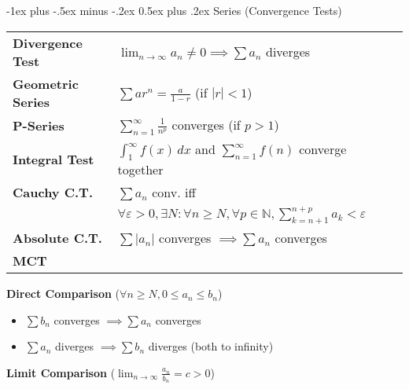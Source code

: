 \documentclass[a4paper,12pt]{article}
\makeatletter
\renewcommand{\section}{\@startsection{section}{1}{0mm}%
                                {-1ex plus -.5ex minus -.2ex}%
                                {0.5ex plus .2ex}%
                                {\normalfont\large\bfseries}}
\makeatother
\begin{document}
\begin{multicols}{2}

\setlength{\premulticols}{1pt}
\setlength{\postmulticols}{1pt}
\setlength{\multicolsep}{1pt}
\setlength{\columnsep}{1pt}

\section{Series (Convergence Tests)}

\renewcommand{\arraystretch}{2} %


\begin{tabular}{@{}ll@{}l@{}}
\textbf{Divergence Test} & $\displaystyle\lim_{n\to\infty} a_n \neq 0 \implies \sum a_n$ diverges \\
\textbf{Geometric Series} & $\displaystyle\sum ar^n = \frac{a}{1-r}$ (if $|r|<1$) \\
\textbf{P-Series} & $\displaystyle\sum_{n=1}^{\infty} \frac{1}{n^p}$ converges (if $p>1$) \\
\textbf{Integral Test} & $\displaystyle\int_{1}^{\infty} f(x) \, dx$ and $\displaystyle\sum_{n=1}^{\infty} f(n)$ converge together \\
\textbf{Cauchy C.T.} & $\displaystyle\sum a_n$ conv. iff \\
& $\forall \varepsilon > 0, \exists N: \forall n \geq N, \forall p \in \mathbb{N}, \sum_{k=n+1}^{n+p} a_k < \varepsilon$ \\
\textbf{Absolute C.T.} & $\sum |a_n|$ converges $\implies \sum a_n$ converges \\
\textbf{MCT} \\

\end{tabular}


\textbf{Direct Comparison} ($\forall n \geq N, 0 \leq a_n \leq b_n$) 
\begin{itemize}
\setlength\itemsep{0em}

\item $\sum b_n$ converges $\implies \sum a_n$ converges
\item $\sum a_n$ diverges $\implies \sum b_n$ diverges (both to infinity)
\end{itemize}

\textbf{Limit Comparison} 
($\lim_{n\to\infty} \frac{a_n}{b_n} = c > 0$)
\begin{itemize}
\setlength\itemsep{0em}


\end{itemize}
\end{multicols}
\end{document}
